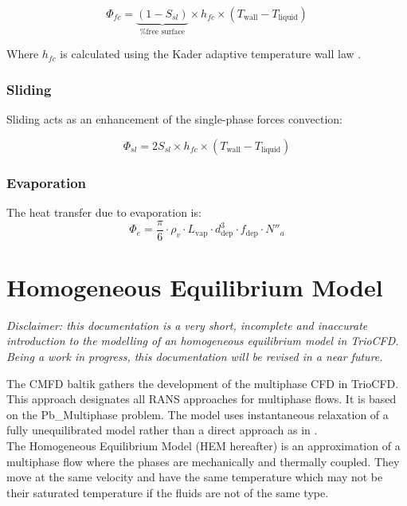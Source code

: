\begin{equation}
	\Phi_{fc}
	=
	\underbrace{(1-S_{sl})}_\text{\% free surface}
	\times
	h_{fc}
	\times
	(T_\text{wall}-T_\text{liquid})
\end{equation}

Where $h_{fc}$ is calculated using the Kader adaptive temperature wall law \cite{Kader1981}.

\subsubsection{Sliding}

Sliding acts as an enhancement of the single-phase forces convection:

\begin{equation}
	\Phi_{sl}
	=
	2 S_{sl}
	\times
	h_{fc}
	\times
	(T_\text{wall}-T_\text{liquid})
\end{equation}

\subsubsection{Evaporation}

The heat transfer due to evaporation is:
\begin{equation}
	\Phi_{e}
	=
	\frac{\pi}{6}
	\cdot
	\rho_v
	\cdot
	L_\text{vap}
	\cdot
	d_\text{dep}^3
	\cdot
	f_\text{dep}
	\cdot
	N''_a
\end{equation}

\section{Homogeneous Equilibrium Model}
\label{sec:homog-equil-model}

\textit{Disclaimer: this documentation is a very short, incomplete and
inaccurate introduction to the modelling of an homogeneous equilibrium
model in TrioCFD. Being a work in progress, this documentation will be
revised in a near future.}

The CMFD baltik gathers the development of the multiphase CFD in
TrioCFD. This approach designates all RANS approaches for multiphase
flows. It is based on the Pb\_Multiphase problem. The model uses
instantaneous relaxation of a fully unequilibrated model rather than a
direct approach as in \cite{Goncalves2009}.\\
The Homogeneous Equilibrium Model (HEM hereafter) is an approximation
of a multiphase flow where the phases are mechanically and thermally
coupled. They move at the same velocity and have the same temperature
which may not be their saturated temperature if the fluids are not of
the same type.


